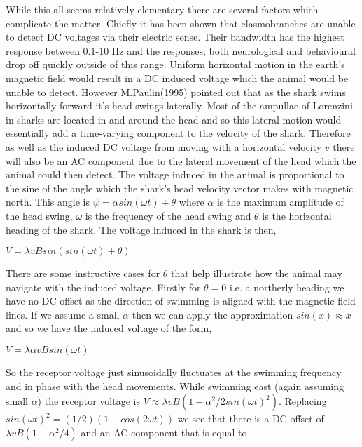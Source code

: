 \documentclass[12pt]{article}
\begin{document}
While this all seems relatively elementary there are several factors which complicate the matter. Chiefly it has been shown that elasmobranches are unable to detect DC voltages via their electric sense. Their bandwidth has the highest response between 0.1-10 Hz and the responses, both neurological and behavioural drop off quickly outside of this range\cite{Montgomery:1999}\cite{Montgomery:1984}. Uniform horizontal motion in the earth's magnetic field would result in a DC induced voltage which the animal would be unable to detect. However M.Paulin(1995) pointed out that as the shark swims horizontally forward it's head swings laterally. Most of the ampullae of Lorenzini in sharks are located in and around the head and so this lateral motion would essentially add a time-varying component to the velocity of the shark. Therefore as well as the induced DC voltage from moving with a horizontal velocity $v$ there will also be an AC component due to the lateral movement of the head which the animal could then detect. The voltage induced in the animal is proportional to the sine of the angle which the shark's head velocity vector makes with magnetic north. This angle is $\psi = \alpha sin(\omega t) + \theta$ where $\alpha$ is the maximum amplitude of the head swing, $\omega$ is the frequency of the head swing and $\theta$ is the horizontal heading of the shark. The voltage induced in the shark is then,

\vspace{4mm}

$V = \lambda vBsin(sin(\omega t) + \theta)$

\vspace{4mm}

There are some instructive cases for $\theta$ that help illustrate how the animal may navigate with the induced voltage. Firstly for $\theta = 0$ i.e. a northerly heading we have no DC offset as the direction of swimming is aligned with the magnetic field lines. If we assume a small $\alpha$ then we can apply the approximation $sin(x) \approx x$ and so we have the induced voltage of the form,

\vspace{4mm}

$V = \lambda \alpha v B sin(\omega t)$

\vspace{4mm}

So the receptor voltage just sinusoidally fluctuates at the swimming frequency and in phase with the head movements. While swimming east (again assuming small $\alpha$) the receptor voltage is $V \approx \lambda vB(1 - \alpha ^2/2sin(\omega t)^2)$. Replacing $sin(\omega t)^2 = (1/2)(1 - cos(2\omega t))$ we see that there is a DC offset of $\lambda vB(1 - \alpha ^2 /4)$ and an AC component that is equal to 
\end{document}
